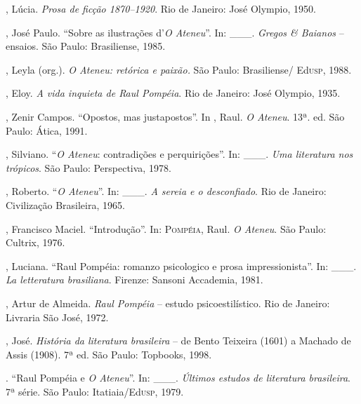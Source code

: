 \begin{bibliohedra}
, Lúcia. \textit{Prosa de ficção 1870--1920}. Rio de
Janeiro: José Olympio, 1950. 

, José Paulo. ``Sobre as ilustrações d'\textit{O
Ateneu}''. In: \_\_\_. \textit{Gregos \& Baianos} -- ensaios. São Paulo:
Brasiliense, 1985.

, Leyla (org.). \textit{O Ateneu: retórica e paixão.}
São Paulo: Brasiliense/ Ed\textsc{usp}, 1988.

, Eloy. \textit{A vida inquieta de Raul Pompéia}.
Rio de Janeiro: José Olympio, 1935.

, Zenir Campos. ``Opostos, mas justapostos''. In
, Raul. \textit{O Ateneu}. 13ª. ed. São Paulo:
Ática, 1991.

, Silviano. ``\textit{O Ateneu}: contradições e perquirições''.
In: \_\_\_. \textit{Uma literatura nos trópicos}. São Paulo:
Perspectiva, 1978.

, Roberto. ``\textit{O Ateneu}''. In: \_\_\_. \textit{A sereia e o
desconfiado}. Rio de Janeiro: Civilização Brasileira, 1965. 

, Francisco Maciel. ``Introdução''. In:
\textsc{Pompéia}, Raul. \textit{O Ateneu}. São Paulo: Cultrix, 1976.

, Luciana. ``Raul Pompéia: romanzo
psicologico e prosa impressionista''. In: \_\_\_. \textit{La letteratura
brasiliana}. Firenze: Sansoni Accademia, 1981.

, Artur de Almeida. \textit{Raul Pompéia} -- estudo
psicoestilístico. Rio de Janeiro: Livraria São José, 1972.

, José. \textit{História da literatura
brasileira } -- de Bento Teixeira (1601) a Machado de
Assis (1908). 7ª 
ed. São Paulo: Topbooks, 1998. 

\titidem. ``Raul Pompéia e \textit{O Ateneu}''. In: \_\_\_.
\textit{Últimos estudos de literatura brasileira}. 7ª
série. São Paulo: Itatiaia/Ed\textsc{usp}, 1979.
\end{bibliohedra}